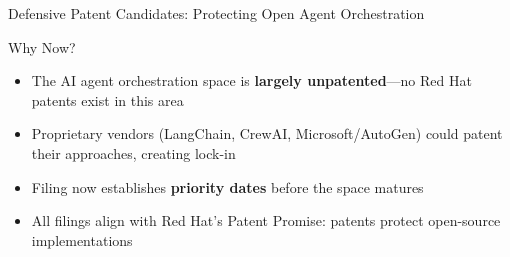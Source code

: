 \begin{frame}{\fontsize{10}{12}\selectfont Defensive Patent Candidates: Protecting Open Agent Orchestration}
\begin{center}
\begin{tikzpicture}[scale=0.7, transform shape,
        cand/.style={rectangle, draw, thick, rounded corners,
                     text width=2.75cm, text centered, minimum height=1.8cm, font=\tiny\bfseries}]
    \end{tikzpicture}
  \end{center}

  \vspace{0.1cm}

  \fontsize{6}{7}\selectfont
  \begin{alertblock}{\fontsize{6}{7}\selectfont Why Now?}
    \fontsize{6}{7}\selectfont
    \begin{itemize}
      \setlength{\itemsep}{0pt}
      \item The AI agent orchestration space is \textbf{largely unpatented}---no Red Hat patents exist in this area
      \item Proprietary vendors (LangChain, CrewAI, Microsoft/AutoGen) could patent their approaches, creating lock-in
      \item Filing now establishes \textbf{priority dates} before the space matures
      \item All filings align with Red Hat's Patent Promise: patents protect open-source implementations
    \end{itemize}
  \end{alertblock}
\end{frame}
